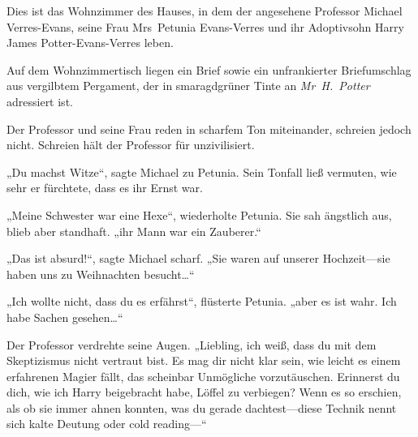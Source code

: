 Dies ist das Wohnzimmer des Hauses, in dem der angesehene Professor Michael Verres-Evans, seine Frau Mrs~Petunia Evans-Verres und ihr Adoptivsohn Harry James Potter-Evans-Verres leben.

Auf dem Wohnzimmertisch liegen ein Brief sowie ein unfrankierter Briefumschlag aus vergilbtem Pergament, der in smaragdgrüner Tinte an \emph{Mr~H.~Potter} adressiert ist.

Der Professor und seine Frau reden in scharfem Ton miteinander, schreien jedoch nicht. Schreien hält der Professor für unzivilisiert.

„Du machst Witze“, sagte Michael zu Petunia. Sein Tonfall ließ vermuten, wie sehr er fürchtete, dass es ihr Ernst war.

„Meine Schwester war eine Hexe“, wiederholte Petunia. Sie sah ängstlich aus, blieb aber standhaft. „ihr Mann war ein Zauberer.“

„Das ist absurd!“, sagte Michael scharf. „Sie waren auf unserer Hochzeit—sie haben uns zu Weihnachten besucht…“

„Ich wollte nicht, dass du es erfährst“, flüsterte Petunia. „aber es ist wahr. Ich habe Sachen gesehen…“

Der Professor verdrehte seine Augen. „Liebling, ich weiß, dass du mit dem Skeptizismus nicht vertraut bist. Es mag dir nicht klar sein, wie leicht es einem erfahrenen Magier fällt, das scheinbar Unmögliche vorzutäuschen. Erinnerst du dich, wie ich Harry beigebracht habe, Löffel zu verbiegen? Wenn es so erschien, als ob sie immer ahnen konnten, was du gerade dachtest—diese Technik nennt sich kalte Deutung oder cold reading—“%

